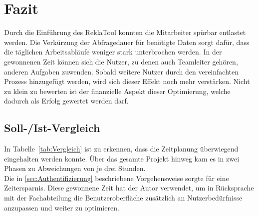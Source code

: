 \section{Fazit} 
\label{sec:Fazit}
Durch die Einführung des ReklaTool konnten die Mitarbeiter spürbar entlastet werden.
Die Verkürzung der Abfragedauer für benötigte Daten sorgt dafür, dass die täglichen Arbeitsabläufe weniger
stark unterbrochen werden. In der gewonnenen Zeit können sich die Nutzer, zu denen auch
Teamleiter gehören, anderen Aufgaben zuwenden. Sobald weitere Nutzer durch den vereinfachten
Prozess hinzugefügt werden, wird sich dieser Effekt noch mehr verstärken. Nicht zu klein zu bewerten
ist der finanzielle Aspekt dieser Optimierung, welche dadurch als Erfolg gewertet werden darf. 

\subsection{Soll-/Ist-Vergleich}
\label{sec:SollIstVergleich}
In Tabelle~\ref{tab:Vergleich} ist zu erkennen, dass die Zeitplanung überwiegend eingehalten werden konnte.
Über das gesamte Projekt hinweg kam es in zwei Phasen zu Abweichungen von je drei Stunden.\\
Die in \ref{sec:Authentifizierung}  beschriebene Vorgehensweise sorgte für eine Zeitersparnis.
Diese gewonnene Zeit hat der Autor verwendet, um in Rücksprache mit der Fachabteilung die Benutzeroberfläche zusätzlich an
Nutzerbedürfnisse anzupassen und weiter zu optimieren.

